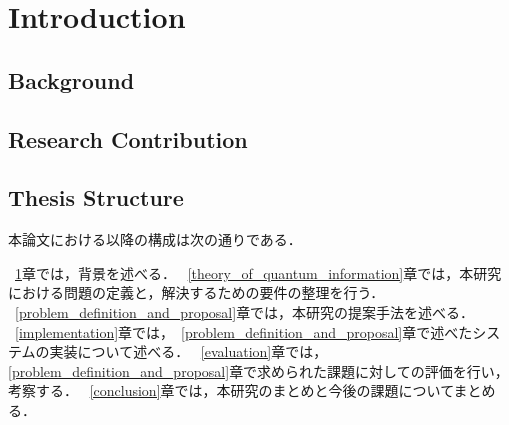 \chapter{Introduction}
\label{introduction}

\section{Background}
\label{introduction:background}


\section{Research Contribution}
\label{introduction:research_contribution}

\section{Thesis Structure}
\label{introduction:thesis_structure}

本論文における以降の構成は次の通りである．

~\ref{introduction}章では，背景を述べる．
~\ref{theory_of_quantum_information}章では，本研究における問題の定義と，解決するための要件の整理を行う．
~\ref{problem_definition_and_proposal}章では，本研究の提案手法を述べる．
~\ref{implementation}章では，~\ref{problem_definition_and_proposal}章で述べたシステムの実装について述べる．
~\ref{evaluation}章では，\ref{problem_definition_and_proposal}章で求められた課題に対しての評価を行い，考察する．
~\ref{conclusion}章では，本研究のまとめと今後の課題についてまとめる．


